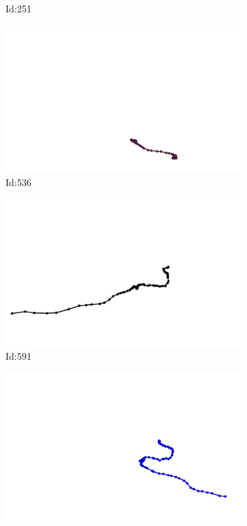 \documentclass[12pt,twoside]{report}
\begin{document}
\begin{figure}
\begin{subfigure}[b]{0.20\textwidth}
\caption{Id:251}
\end{subfigure}
\begin{subfigure}[b]{0.20\textwidth}
\centering
\includegraphics[width=\textwidth]{../../trajectories/536.png}
\caption{Id:536}
\end{subfigure}
\begin{subfigure}[b]{0.20\textwidth}
\centering
\includegraphics[width=\textwidth]{../../trajectories/591.png}
\caption{Id:591}
\end{subfigure}
\begin{subfigure}[b]{0.20\textwidth}
\centering
\includegraphics[width=\textwidth]{../../trajectories/770.png}

\end{subfigure}
\end{figure}
\end{document}
